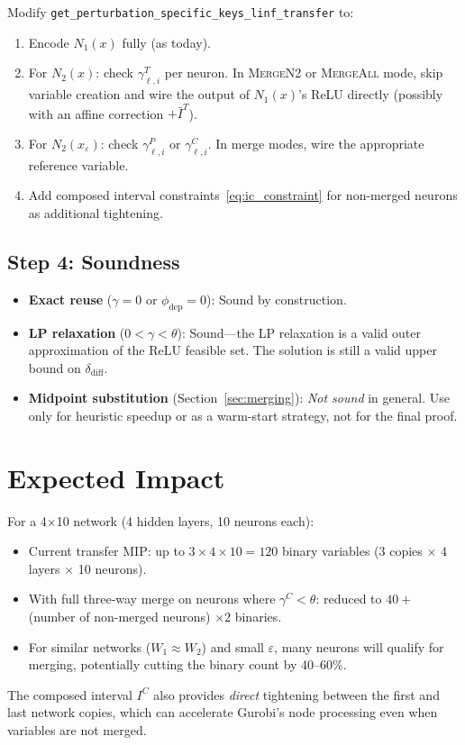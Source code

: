 \documentclass[11pt]{article}
\newcommand{\layerl}{\ell}
\begin{document}
Modify \texttt{get\_perturbation\_specific\_keys\_linf\_transfer} to:
\begin{enumerate}
    \item Encode $N_1(x)$ fully (as today).
    \item For $N_2(x)$: check $\gamma^T_{\layerl,i}$ per neuron.
          In \textsc{MergeN2} or \textsc{MergeAll} mode, skip variable creation
          and wire the output of $N_1(x)$'s ReLU directly (possibly with an
          affine correction $+\bar{I}^T$).
    \item For $N_2(x_\varepsilon)$: check $\gamma^P_{\layerl,i}$ or $\gamma^C_{\layerl,i}$.
          In merge modes, wire the appropriate reference variable.
    \item Add composed interval constraints~\eqref{eq:ic_constraint} for non-merged neurons
          as additional tightening.
\end{enumerate}

\subsection{Step 4: Soundness}

\begin{itemize}
    \item \textbf{Exact reuse} ($\gamma = 0$ or $\phi_{\text{dep}}=0$):
          Sound by construction.
    \item \textbf{LP relaxation} ($0 < \gamma < \theta$):
          Sound---the LP relaxation is a valid outer approximation of the
          ReLU feasible set. The solution is still a valid upper bound on $\delta_{\text{diff}}$.
    \item \textbf{Midpoint substitution} (Section~\ref{sec:merging}):
          \emph{Not sound} in general. Use only for heuristic speedup
          or as a warm-start strategy, not for the final proof.
\end{itemize}


\section{Expected Impact}

For a 4$\times$10 network (4 hidden layers, 10 neurons each):
\begin{itemize}
    \item Current transfer MIP: up to $3 \times 4 \times 10 = 120$ binary variables
          (3 copies $\times$ 4 layers $\times$ 10 neurons).
    \item With full three-way merge on neurons where $\gamma^C < \theta$:
          reduced to $40 + $ (number of non-merged neurons) $\times 2$ binaries.
    \item For similar networks ($W_1 \approx W_2$) and small $\varepsilon$,
          many neurons will qualify for merging, potentially cutting the
          binary count by 40--60\%.
\end{itemize}

The composed interval $I^C$ also provides \emph{direct} tightening between the
first and last network copies, which can accelerate Gurobi's node processing
even when variables are not merged.
\end{document}
